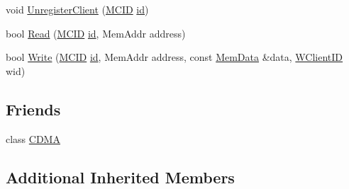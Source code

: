 \begin{DoxyCompactItemize}
\item 
void \hyperlink{class_simulator_1_1_c_d_m_a_1_1_cache_a83139672baa1452be9a0cc2d03cb7daf}{Unregister\+Client} (\hyperlink{namespace_simulator_a4b5747ff30c62c6373badf3b53b9abf7}{M\+C\+I\+D} \hyperlink{mtconf_8c_aa3185401f04d30bd505daebf48c39cc5}{id})
\item 
bool \hyperlink{class_simulator_1_1_c_d_m_a_1_1_cache_a0076553985970d938b290e2254cdce51}{Read} (\hyperlink{namespace_simulator_a4b5747ff30c62c6373badf3b53b9abf7}{M\+C\+I\+D} \hyperlink{mtconf_8c_aa3185401f04d30bd505daebf48c39cc5}{id}, Mem\+Addr address)
\item 
bool \hyperlink{class_simulator_1_1_c_d_m_a_1_1_cache_a136f64febe5fcd8a4134d2ba4b60b7e3}{Write} (\hyperlink{namespace_simulator_a4b5747ff30c62c6373badf3b53b9abf7}{M\+C\+I\+D} \hyperlink{mtconf_8c_aa3185401f04d30bd505daebf48c39cc5}{id}, Mem\+Addr address, const \hyperlink{struct_simulator_1_1_mem_data}{Mem\+Data} \&data, \hyperlink{namespace_simulator_a0de605c35951a450d074222efcef6359}{W\+Client\+I\+D} wid)
\end{DoxyCompactItemize}
\subsection*{Friends}
\begin{DoxyCompactItemize}
\item 
class \hyperlink{class_simulator_1_1_c_d_m_a_1_1_cache_add415c7c29b0f2d422db4e084c6688e3}{C\+D\+M\+A}
\end{DoxyCompactItemize}
\subsection*{Additional Inherited Members}


